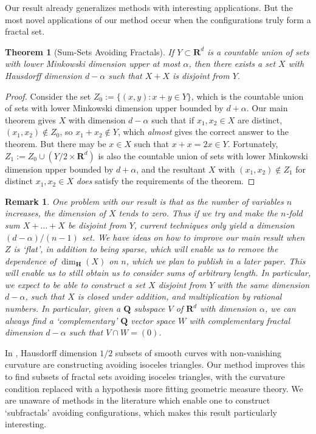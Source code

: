 \documentclass[usenames,dvipsnames]{article}
\theoremstyle{plain}
\theoremstyle{plain}
\newtheorem{theorem}{Theorem}
\newtheorem*{remark}{Remark}
\begin{document}
Our result already generalizes methods with interesting applications. But the most novel applications of our method occur when the configurations truly form a fractal set.

\begin{theorem}[Sum-Sets Avoiding Fractals]
	If $Y \subset \mathbf{R}^d$ is a countable union of sets with lower Minkowski dimension upper at most $\alpha$, then there exists a set $X$ with Hausdorff dimension $d-\alpha$ such that $X + X$ is disjoint from $Y$.
\end{theorem}
\begin{proof}
	Consider the set $Z_0 := \{ (x,y): x + y \in Y \}$, which is the countable union of sets with lower Minkowski dimension upper bounded by $d + \alpha$. Our main theorem gives $X$ with dimension $d - \alpha$ such that if $x_1,x_2 \in X$ are distinct, $(x_1,x_2) \not \in Z_0$, so $x_1 + x_2 \not \in Y$, which {\it almost} gives the correct answer to the theorem. But there may be $x \in X$ such that $x + x = 2x \in Y$. Fortunately, $Z_1 := Z_0 \cup (Y/2 \times \mathbf{R}^d)$ is also the countable union of sets with lower Minkowski dimension upper bounded by $d + \alpha$, and the resultant $X$ with $(x_1,x_2) \not \in Z_1$ for distinct $x_1,x_2 \in X$ {\it does} satisfy the requirements of the theorem.
\end{proof}

\begin{remark}
	One problem with our result is that as the number of variables $n$ increases, the dimension of $X$ tends to zero. Thus if we try and make the $n$-fold sum $X + \dots + X$ be disjoint from $Y$, current techniques only yield a dimension $(d - \alpha)/(n-1)$ set. We have ideas on how to improve our main result when $Z$ is `flat', in addition to being sparse, which will enable us to remove the dependence of $\dim_{\mathbf{H}}(X)$ on $n$, which we plan to publish in a later paper. This will enable us to still obtain us to consider sums of arbitrary length. In particular, we expect to be able to construct a set $X$ disjoint from $Y$ with the same dimension $d - \alpha$, such that $X$ is closed under addition, and multiplication by rational numbers. In particular, given a $\mathbf{Q}$ subspace $V$ of $\mathbf{R}^d$ with dimension $\alpha$, we can always find a `complementary' $\mathbf{Q}$ vector space $W$ with complementary fractal dimension $d - \alpha$ such that $V \cap W = (0)$.
\end{remark}

In \cite{MalabikaRob}, Hausdorff dimension $1/2$ subsets of smooth curves with non-vanishing curvature are constructing avoiding isoceles triangles. Our method improves this to find subsets of fractal sets avoiding isoceles triangles, with the curvature condition replaced with a hypothesis more fitting geometric measure theory. We are unaware of methods in the literature which enable one to construct `subfractals' avoiding configurations, which makes this result particularly interesting.
\end{document}
